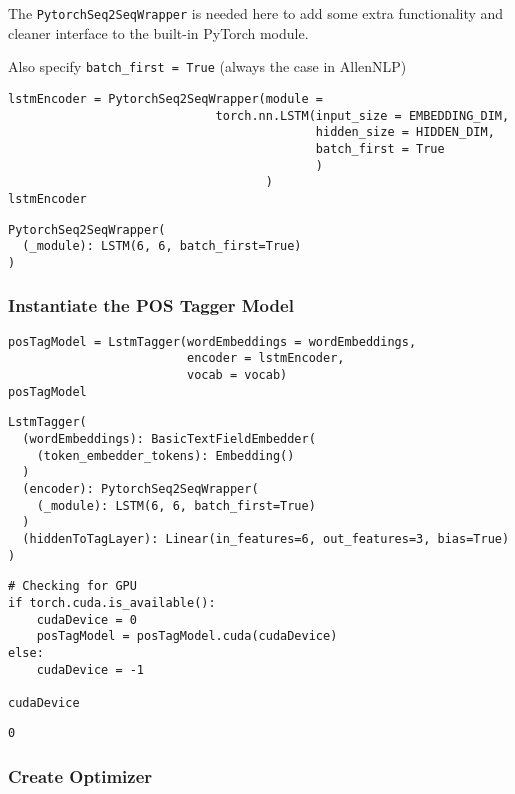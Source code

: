 \documentclass[
]{article}
\begin{document}
The \texttt{PytorchSeq2SeqWrapper} is needed here to add some extra
functionality and cleaner interface to the built-in PyTorch module.

Also specify \texttt{batch\_first\ =\ True} (always the case in
AllenNLP)

\begin{verbatim}
lstmEncoder = PytorchSeq2SeqWrapper(module =
                             torch.nn.LSTM(input_size = EMBEDDING_DIM,
                                           hidden_size = HIDDEN_DIM,
                                           batch_first = True
                                           )
                                    )
lstmEncoder
\end{verbatim}

\begin{verbatim}
PytorchSeq2SeqWrapper(
  (_module): LSTM(6, 6, batch_first=True)
)
\end{verbatim}

\hypertarget{instantiate-the-pos-tagger-model}{%
\subsubsection{Instantiate the POS Tagger
Model}\label{instantiate-the-pos-tagger-model}}

\begin{verbatim}
posTagModel = LstmTagger(wordEmbeddings = wordEmbeddings,
                         encoder = lstmEncoder,
                         vocab = vocab)
posTagModel
\end{verbatim}

\begin{verbatim}
LstmTagger(
  (wordEmbeddings): BasicTextFieldEmbedder(
    (token_embedder_tokens): Embedding()
  )
  (encoder): PytorchSeq2SeqWrapper(
    (_module): LSTM(6, 6, batch_first=True)
  )
  (hiddenToTagLayer): Linear(in_features=6, out_features=3, bias=True)
)
\end{verbatim}

\begin{verbatim}
# Checking for GPU
if torch.cuda.is_available():
    cudaDevice = 0
    posTagModel = posTagModel.cuda(cudaDevice)
else:
    cudaDevice = -1

cudaDevice
\end{verbatim}

\begin{verbatim}
0
\end{verbatim}

\hypertarget{create-optimizer}{%
\subsubsection{Create Optimizer}\label{create-optimizer}}
\end{document}
